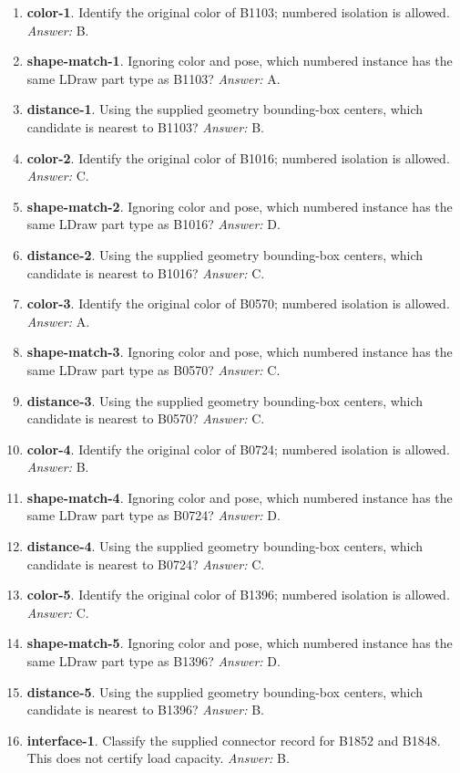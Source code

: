 \begin{enumerate}
\item \textbf{color-1}. Identify the original color of B1103; numbered isolation is allowed. \textit{Answer:} B.
\item \textbf{shape-match-1}. Ignoring color and pose, which numbered instance has the same LDraw part type as B1103? \textit{Answer:} A.
\item \textbf{distance-1}. Using the supplied geometry bounding-box centers, which candidate is nearest to B1103? \textit{Answer:} B.
\item \textbf{color-2}. Identify the original color of B1016; numbered isolation is allowed. \textit{Answer:} C.
\item \textbf{shape-match-2}. Ignoring color and pose, which numbered instance has the same LDraw part type as B1016? \textit{Answer:} D.
\item \textbf{distance-2}. Using the supplied geometry bounding-box centers, which candidate is nearest to B1016? \textit{Answer:} C.
\item \textbf{color-3}. Identify the original color of B0570; numbered isolation is allowed. \textit{Answer:} A.
\item \textbf{shape-match-3}. Ignoring color and pose, which numbered instance has the same LDraw part type as B0570? \textit{Answer:} C.
\item \textbf{distance-3}. Using the supplied geometry bounding-box centers, which candidate is nearest to B0570? \textit{Answer:} C.
\item \textbf{color-4}. Identify the original color of B0724; numbered isolation is allowed. \textit{Answer:} B.
\item \textbf{shape-match-4}. Ignoring color and pose, which numbered instance has the same LDraw part type as B0724? \textit{Answer:} D.
\item \textbf{distance-4}. Using the supplied geometry bounding-box centers, which candidate is nearest to B0724? \textit{Answer:} C.
\item \textbf{color-5}. Identify the original color of B1396; numbered isolation is allowed. \textit{Answer:} C.
\item \textbf{shape-match-5}. Ignoring color and pose, which numbered instance has the same LDraw part type as B1396? \textit{Answer:} D.
\item \textbf{distance-5}. Using the supplied geometry bounding-box centers, which candidate is nearest to B1396? \textit{Answer:} B.
\item \textbf{interface-1}. Classify the supplied connector record for B1852 and B1848. This does not certify load capacity. \textit{Answer:} B.

\end{enumerate}
